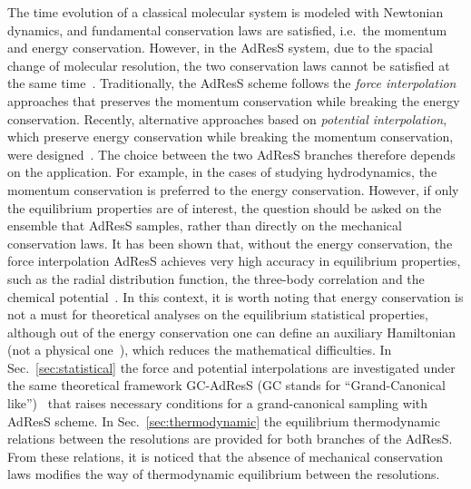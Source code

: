 \documentclass[epjST]{svjour}
\newcommand{\recheck}[1]{{\color{red} #1}}
\begin{document}
The time evolution of a classical molecular system
is modeled with Newtonian dynamics, and fundamental conservation laws
are satisfied, i.e.~the momentum and energy conservation.
However, in the AdResS system,
due to the spacial change of molecular resolution,
the two conservation laws cannot be satisfied at the same time~\cite{praprotnik2011comment,dellesite2007some}.
Traditionally, the AdResS scheme follows the \emph{force interpolation} approaches
that preserves the momentum conservation while breaking the energy
conservation.
Recently,
alternative approaches based on \emph{potential interpolation},
which preserve energy conservation while breaking the momentum conservation,
were designed~\cite{wang2013grand,potestio2013hamiltonian}.
The choice between the two AdResS branches therefore depends on the application. For example, in the
cases of studying hydrodynamics, the momentum conservation is preferred to the energy conservation.
However, if only the equilibrium properties are of interest,
the question should be asked on the ensemble that AdResS samples,
rather than directly on the mechanical conservation laws.
\recheck{It has been shown that, without the energy conservation, the force interpolation AdResS achieves
very high accuracy in equilibrium properties, such as the radial distribution function, the three-body correlation and the chemical potential~\cite{wang2013grand}.}
In this context,
it is worth noting that energy conservation is not a must for theoretical analyses on the equilibrium statistical properties,
although out of the energy conservation
one can define an auxiliary Hamiltonian~\cite{wang2013grand,agarwal2014chemical}
(not a physical one~\cite{dellesite2013multiscale}),
which reduces the mathematical difficulties.
In Sec.~\ref{sec:statistical} the force and potential interpolations are investigated 
under the same theoretical framework GC-AdResS (GC stands for ``Grand-Canonical like'')~\cite{wang2013grand} that raises necessary conditions
for a grand-canonical sampling with AdResS scheme.
In Sec.~\ref{sec:thermodynamic} the equilibrium thermodynamic relations between the resolutions are
provided for both branches of the AdResS.
From these relations, it is noticed that the absence of mechanical conservation laws 
modifies the way of thermodynamic equilibrium between the resolutions.
\end{document}
